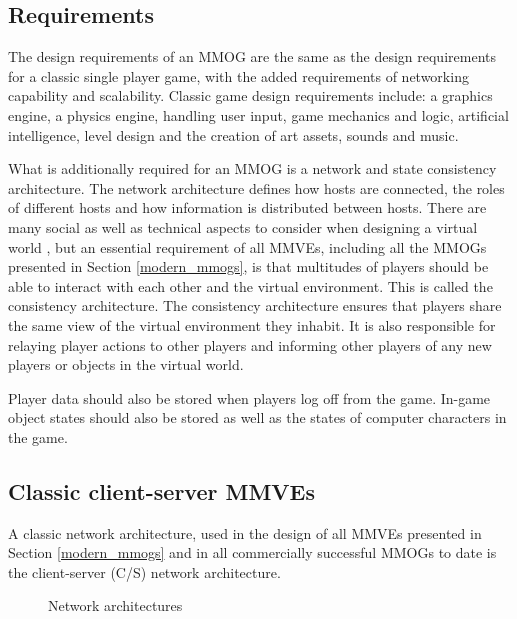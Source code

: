 \subsection{Requirements}

The design requirements of an MMOG are the same as the design requirements for a classic single player game, with the added requirements of networking capability and scalability. Classic game design requirements include: a graphics engine, a physics engine, handling user input, game mechanics and logic, artificial intelligence, level design and the creation of art assets, sounds and music.

What is additionally required for an MMOG is a network and state consistency architecture. The network architecture defines how hosts are connected, the roles of different hosts and how information is distributed between hosts. There are many social as well as technical aspects to consider when designing a virtual world \cite{designing_virtual_worlds}, but an essential requirement of all MMVEs, including all the MMOGs presented in Section \ref{modern_mmogs}, is that multitudes of players should be able to interact with each other and the virtual environment. This is called the consistency architecture. The consistency architecture ensures that players share the same view of the virtual environment they inhabit. It is also responsible for relaying player actions to other players and informing other players of any new players or objects in the virtual world.

Player data should also be stored when players log off from the game. In-game object states should also be stored as well as the states of computer characters in the game.

\subsection{Classic client-server MMVEs}

A classic network architecture, used in the design of all MMVEs presented in Section \ref{modern_mmogs} and in all commercially successful MMOGs to date is the client-server (C/S) network architecture.

\begin{figure}[htbp]
\centering
\caption{Network architectures}
\end{figure}

